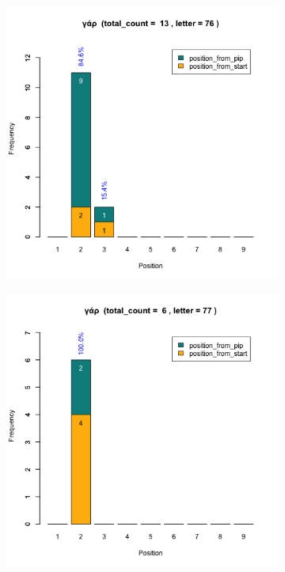 \documentclass[a4paper]{article}
\begin{document}
\begin{figure}
\begin{subfigure}{0.45\textwidth}
\end{subfigure}
\begin{subfigure}{0.45\textwidth}
\centering
\includegraphics[width=1\linewidth]{../../data/output/paul_R_par/plots/par1_lt76.png}
\end{subfigure}
\begin{subfigure}{0.45\textwidth}
\centering
\includegraphics[width=1\linewidth]{../../data/output/paul_R_par/plots/par1_lt77.png}
\end{subfigure}
\end{figure}
\end{document}
